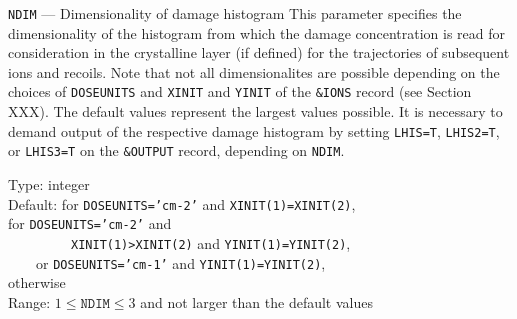 \iffalse                       %
\begin{keydescription}{\texttt{NCLUS} --- Cluster size}
%
  This parameter specifies the number of atoms per cluster.
  \texttt{NCLUS} random interstitials are assumed to be clustered to
  one cluster each. The cluster is assumed to be a cylinder around the
  ion trajectory with radius \texttt{PMAX}. \texttt{NCLUS} may only be
  specified with \texttt{LAMO2=T}.
  \begin{keytab}
    Type:    \> integer \\
    Default: \> 1 \\
    Range:   \> $\ge 1$ \\
    Remark:  \> not yet implemented
  \end{keytab}
\end{keydescription}
\fi

\begin{keydescription}{\texttt{NDIM} --- Dimensionality of damage histogram}
%
  This parameter specifies the dimensionality of the histogram from which
  the damage concentration is read for consideration in the crystalline 
  layer (if defined) for the trajectories of subsequent ions and recoils.
  Note that not all dimensionalites are possible depending on the choices 
  of \texttt{DOSEUNITS} and \texttt{XINIT} and \texttt{YINIT} of the
  \texttt{\&IONS} record (see Section XXX). The default values represent the
  largest values possible. It is necessary to demand output of the respective
  damage histogram by setting \texttt{LHIS=T}, \texttt{LHIS2=T}, or
  \texttt{LHIS3=T} on the \texttt{\&OUTPUT} record, depending on \texttt{NDIM}. 
  \begin{keytab}
    Type:    \> integer \\
    Default:  for \texttt{DOSEUNITS='cm-2'} and 
                      \texttt{XINIT(1)=XINIT(2)}, \\
              for \texttt{DOSEUNITS='cm-2'} and \\
             \> \ \ \ \ \ \ \ \ \ \texttt{XINIT(1)>XINIT(2)} and 
                        \texttt{YINIT(1)=YINIT(2)}, \\
            \> \ \ \ \ or \texttt{DOSEUNITS='cm-1'} and
                      \texttt{YINIT(1)=YINIT(2)}, \\
              otherwise \\
    Range:   \> $1 \le \texttt{NDIM} \le 3$ and not larger than the default
                values
  \end{keytab}
\end{keydescription}

